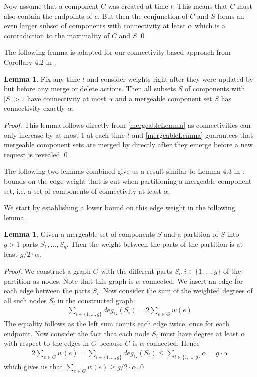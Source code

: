 \documentclass[a4paper, 10pt]{article}
\newcommand{\nl}{\newline}
\newcommand{\crep}{\text{C{\scriptsize REP}}}
\theoremstyle{definition}
\newtheorem{lemma}[defi]{Lemma}
\begin{document}
Now assume that a component $C$ was created at time $t$. This means that $C$ must also contain the endpoints of $e$. But then the conjunction of $C$ and $S$ forms an even larger subset of components with connectivity at least $\alpha$ which is a contradiction to the maximality of $C$ and $S$.\qed\nl

The following lemma is adapted for our connectivity-based approach from Corollary 4.2 in \cite{Avin2015}.

\begin{lemma}
	\label{mergeable_lemma}
	Fix any time $t$ and consider weights right after they were updated by \crep{} but before any merge or delete actions. Then all subsets $S$ of components with $|S|>1$ have connectivity at most $\alpha$ and a mergeable component set $S$ has connectivity exactly $\alpha$.
\end{lemma}

\textit{Proof.} This lemma follows directly from \cref{mergeableLemma} as connectivities can only increase by at most 1 at each time $t$ and \cref{mergeableLemma} guarantees that mergeable component sets are merged by \crep{} directly after they emerge before a new request is revealed.\qed\nl

The following two lemmas combined give us a result similar to Lemma 4.3 in \cite{Avin2015}: bounds on the edge weight that is cut when partitioning a mergeable component set, i.e. a set of components of connectivity at least $\alpha$.

We start by establishing a lower bound on this edge weight in the following lemma.

\begin{lemma}
	\label{cut_lemma}
	Given a mergeable set of components $S$ and a partition of $S$ into $g>1$ parts $S_1,...,S_g$. Then the weight between the parts of the partition is at least $g/2 \cdot \alpha$.
\end{lemma}
\textit{Proof.} We construct a graph $G$ with the different parts $S_i, i\in\{1,...,g\}$ of the partition as nodes. Note that this graph is $\alpha$-connected. We insert an edge for each edge between the parts $S_i$. Now consider the sum of the weighted degrees of all such nodes $S_i$ in the constructed graph:
\begin{align*}
\sum_{i\in\{1,...,g\}}deg_G(S_i)=2\sum_{e\in G}w(e)
\end{align*}
The equality follows as the left sum counts each edge twice, once for each endpoint.
Now consider the fact that each node $S_i$ must have degree at least $\alpha$ with respect to the edges in $G$ because $G$ is $\alpha$-connected. Hence
\begin{align*}
2\sum_{e\in G}w(e)=\sum_{i\in\{1,...,g\}}deg_G(S_i)\leq\sum_{i\in\{1,...,g\}}\alpha=g\cdot\alpha
\end{align*}
which gives us that $\sum_{e\in G}w(e)\geq g/2\cdot\alpha$.\qed\nl
\end{document}

